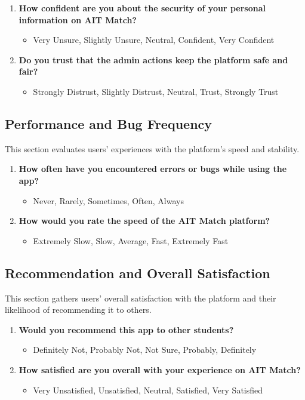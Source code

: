 \begin{enumerate}
\item \textbf{How confident are you about the security of your personal information on AIT Match?}
\begin{itemize}
\item Very Unsure, Slightly Unsure, Neutral, Confident, Very Confident
\end{itemize}
\item \textbf{Do you trust that the admin actions keep the platform safe and fair?}
\begin{itemize}
\item Strongly Distrust, Slightly Distrust, Neutral, Trust, Strongly Trust
\end{itemize}
\end{enumerate}

\newpage
\subsection{Performance and Bug Frequency}

This section evaluates users’ experiences with the platform’s speed and stability.

\begin{enumerate}
\item \textbf{How often have you encountered errors or bugs while using the app?}
\begin{itemize}
\item Never, Rarely, Sometimes, Often, Always
\end{itemize}
\item \textbf{How would you rate the speed of the AIT Match platform?}
\begin{itemize}
\item Extremely Slow, Slow, Average, Fast, Extremely Fast
\end{itemize}
\end{enumerate}

\subsection{Recommendation and Overall Satisfaction}

This section gathers users’ overall satisfaction with the platform and their likelihood of recommending it to others.

\begin{enumerate}
\item \textbf{Would you recommend this app to other students?}
\begin{itemize}
\item Definitely Not, Probably Not, Not Sure, Probably, Definitely
\end{itemize}
\item \textbf{How satisfied are you overall with your experience on AIT Match?}
\begin{itemize}
\item Very Unsatisfied, Unsatisfied, Neutral, Satisfied, Very Satisfied
\end{itemize}
\end{enumerate}

